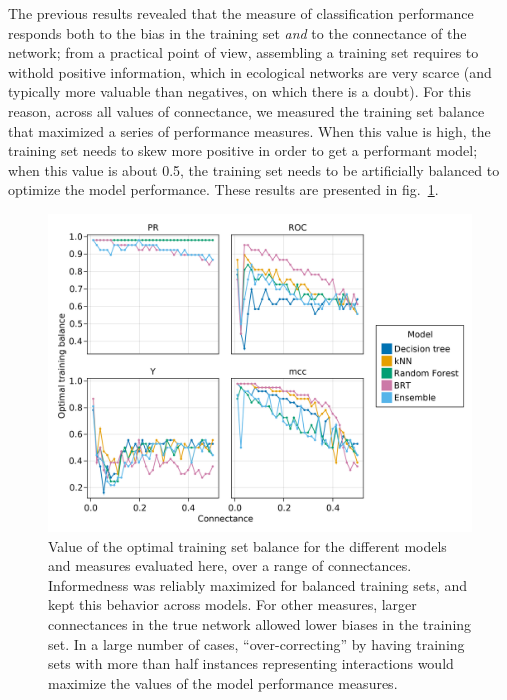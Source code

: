 \documentclass[11pt]{article}
\makeatletter
\def\maxwidth{\ifdim\Gin@nat@width>\linewidth\linewidth
\else\Gin@nat@width\fi}
\let\Oldincludegraphics\includegraphics
\renewcommand{\includegraphics}[1]{\Oldincludegraphics[width=\maxwidth]{#1}}
\makeatother
\begin{document}
The previous results revealed that the measure of classification
performance responds both to the bias in the training set \emph{and} to
the connectance of the network; from a practical point of view,
assembling a training set requires to withold positive information,
which in ecological networks are very scarce (and typically more
valuable than negatives, on which there is a doubt). For this reason,
across all values of connectance, we measured the training set balance
that maximized a series of performance measures. When this value is
high, the training set needs to skew more positive in order to get a
performant model; when this value is about 0.5, the training set needs
to be artificially balanced to optimize the model performance. These
results are presented in fig.~\ref{fig:optimbias}.

\begin{figure}
\hypertarget{fig:optimbias}{%
\centering
\includegraphics{figures/optimal_bias.png}
\caption{Value of the optimal training set balance for the different
models and measures evaluated here, over a range of connectances.
Informedness was reliably maximized for balanced training sets, and kept
this behavior across models. For other measures, larger connectances in
the true network allowed lower biases in the training set. In a large
number of cases, ``over-correcting'' by having training sets with more
than half instances representing interactions would maximize the values
of the model performance measures.}\label{fig:optimbias}
}
\end{figure}
\end{document}
